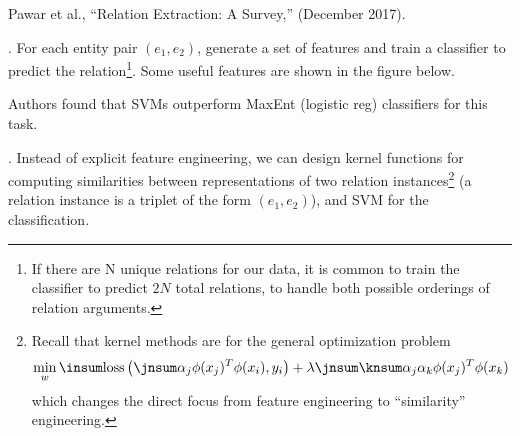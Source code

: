 \documentclass[11pt]{article}
\begin{document}
\vspace{-1em}
{\footnotesize Pawar et al., ``Relation Extraction: A Survey,'' (December 2017).}



\p {}. For each entity pair $(e_1, e_2)$, generate a set of features and train a classifier to predict the relation\footnote{If there are N unique relations for our data, it is common to train the classifier to predict $2N$ total relations, to handle both possible orderings of relation arguments.}. Some useful features are shown in the figure below.

Authors found that SVMs outperform MaxEnt (logistic reg) classifiers for this task.


\myspace
\p {}. Instead of explicit feature engineering, we can design kernel functions for computing similarities between representations of two relation instances\footnote{Recall that kernel methods are for the general optimization problem 
	\begin{align}
	\min_w \insum \text{loss}\left( \jnsum \alpha_j \phi(x_j)^T \phi(x_i), y_i  \right) + \lambda \jnsum \knsum \alpha_j \alpha_k \phi(x_j)^T\phi(x_k)
	\end{align}
	which changes the direct focus from feature engineering to ``similarity'' engineering.
} (a relation instance is a triplet of the form $(e_1, e_2)$), and SVM for the classification. \\
\end{document}
